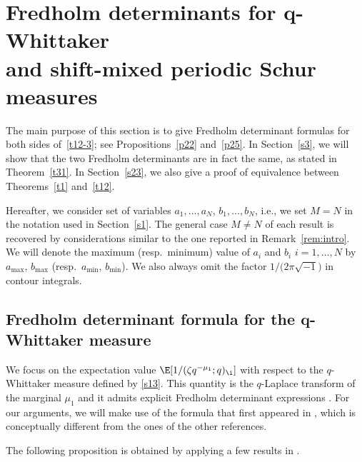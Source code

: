 \section[Fredholm determinants for q-Whittaker and shift-mixed periodic Schur measures]{Fredholm determinants for $\boldsymbol{q}$-Whittaker\\ and shift-mixed periodic Schur measures}
\label{s2}

The main purpose of this section is to give Fredholm determinant formulas for both sides of~\eqref{t12-3}; see Propositions~\ref{p22} and~\ref{p25}.
In Section~\ref{s3}, we will show that the two Fredholm determinants are in fact the same,
as stated in Theorem~\ref{t31}. In Section~\ref{s23}, we also give a proof of equivalence between Theorems~\ref{t1} and~\ref{t12}.

Hereafter, we consider set of variables $a_1,\dots,a_N$, $b_1,\dots,b_N$, i.e., we set $M=N$ in the notation used in Section~\ref{s1}. The general case $M \neq N$ of each result is recovered by considerations similar to the one reported in Remark~\ref{rem:intro}. We will denote the maximum (resp.\ minimum) value of $a_i$ and $b_i$ $i=1,\dots,N$ by $a_{\max}$, $b_{\max}$ (resp.\ $a_{\min}$, $b_{\min}$). We also always omit the factor $1/\big(2\pi \sqrt{-1}\big)$ in contour integrals.

\subsection[Fredholm determinant formula for the q-Whittaker measure]{Fredholm determinant formula for the $\boldsymbol{q}$-Whittaker measure}
\label{s21}

We focus on the expectation value $\E[1/(\zeta q^{-\mu_1};q)_{\i}]$ with respect to the $q$-Whittaker measure defined by \eqref{s13}. This quantity is the $q$-Laplace transform of the marginal $\mu_1$ and it admits explicit Fredholm determinant expressions \cite{BorodinCorwin2014Mac,BoCoFeVe2015,BufetovMucciconiPetrov2019,ImamuraSasamoto2019qTASEPtheta,MatveevPetrov2015}. For our arguments, we will make use of the formula that first appeared in \cite{ImamuraSasamoto2019qTASEPtheta}, which is conceptually different from the ones of the other references.

The following proposition is obtained by applying a few results
in \cite{ImamuraSasamoto2019qTASEPtheta}.


